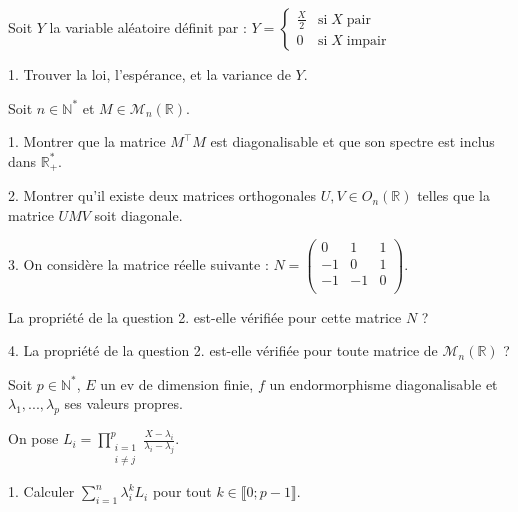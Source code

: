 \noindent Soit $Y$ la variable aléatoire définit par : $Y =
\begin{cases}
  \frac {X} {2} & \mathrm{si} \;X\; \mathrm{pair}   \\    
  0             & \mathrm{si} \;X\; \mathrm{impair} 
\end{cases}
$

\vspace{5pt}
1. Trouver la loi, l'espérance, et la variance de $Y$.



\subetoiles



\noindent Soit $n \in \mathbb{N}^*$ et $M \in \mathcal{M}_n(\mathbb{R})$.

\vspace{5pt}
1. Montrer que la matrice $M^\top M$ est diagonalisable et que son spectre est inclus dans $\mathbb{R}_+^*$.

\vspace{5pt}
2. Montrer qu'il existe deux matrices orthogonales $U, V \in O_n(\mathbb{R})$ telles que la matrice $UMV$ soit diagonale.

\vspace{5pt}
3. On considère la matrice réelle suivante : $ N =
\begin{pmatrix}
 0 &  1 & 1 \\
-1 &  0 & 1 \\
-1 & -1 & 0 \\
\end{pmatrix}
$.

La propriété de la question 2. est-elle vérifiée pour cette matrice $N$ ?

\vspace{5pt}
4. La propriété de la question 2. est-elle vérifiée pour toute matrice de $\mathcal{M}_n(\mathbb{R})$ ?



\subetoiles



\noindent Soit $p \in \mathbb{N}^*$, $E$ un ev de dimension finie, $f$ un endormorphisme diagonalisable et $\lambda_1, ..., \lambda_p$ ses valeurs propres.

\noindent On pose $\displaystyle L_i = \prod_{\substack{i = 1 \\ i \ne j}}^{p} \frac {X - \lambda_i} {\lambda_i - \lambda_j}$.

\vspace{5pt}
1. Calculer $\displaystyle \sum_{i=1}^{n}\lambda_i^kL_i$ pour tout $k \in \llbracket 0;p-1 \rrbracket$.

